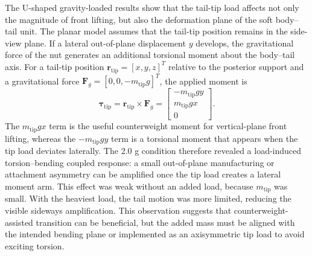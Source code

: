 The U-shaped gravity-loaded results show that the tail-tip load affects not only the magnitude of front lifting, but also the deformation plane of the soft body--tail unit. The planar model assumes that the tail-tip position remains in the side-view plane. If a lateral out-of-plane displacement $y$ develops, the gravitational force of the nut generates an additional torsional moment about the body--tail axis. For a tail-tip position $\mathbf{r}_{\mathrm{tip}}=[x,y,z]^T$ relative to the posterior support and a gravitational force $\mathbf{F}_g=[0,0,-m_{\mathrm{tip}}g]^T$, the applied moment is
\begin{equation}
  \boldsymbol{\tau}_{\mathrm{tip}}
  = \mathbf{r}_{\mathrm{tip}} \times \mathbf{F}_g
  =
  \begin{bmatrix}
    -m_{\mathrm{tip}}gy \\
    m_{\mathrm{tip}}gx \\
    0
  \end{bmatrix} .
  \label{eqn:out_of_plane_tip_moment}
\end{equation}
The $m_{\mathrm{tip}}gx$ term is the useful counterweight moment for vertical-plane front lifting, whereas the $-m_{\mathrm{tip}}gy$ term is a torsional moment that appears when the tip load deviates laterally. The 2.0 g condition therefore revealed a load-induced torsion--bending coupled response: a small out-of-plane manufacturing or attachment asymmetry can be amplified once the tip load creates a lateral moment arm. This effect was weak without an added load, because $m_{\mathrm{tip}}$ was small. With the heaviest load, the tail motion was more limited, reducing the visible sideways amplification. This observation suggests that counterweight-assisted transition can be beneficial, but the added mass must be aligned with the intended bending plane or implemented as an axisymmetric tip load to avoid exciting torsion.

